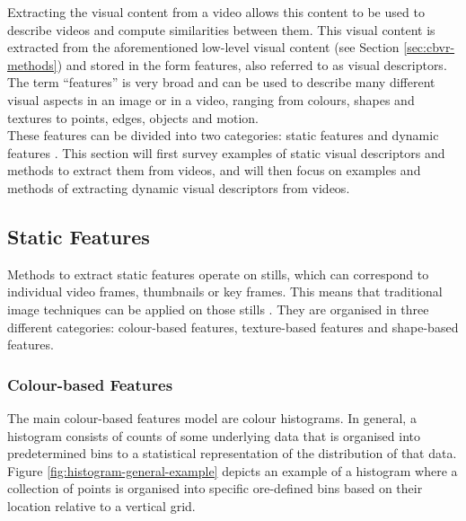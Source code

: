 Extracting the visual content from a video allows this content to be used to describe videos and compute similarities between them. This visual content is extracted from the aforementioned low-level visual content (see Section \ref{sec:cbvr-methods}) \cite{petkovic2000} and stored in the form features, also referred to as visual descriptors. The term ``features'' is very broad and can be used to describe many different visual aspects in an image or in a video, ranging from colours, shapes and textures to points, edges, objects and motion.\\

These features can be divided into two categories: static features and dynamic features \cite{petkovic2000}. This section will first survey examples of static visual descriptors and methods to extract them from videos, and will then focus on examples and methods of extracting dynamic visual descriptors from videos.


\subsection{Static Features}

Methods to extract static features operate on stills, which can correspond to individual video frames, thumbnails or key frames. This means that traditional image techniques can be applied on those stills \cite{hu2011survey}. They are organised in three different categories: colour-based features, texture-based features and shape-based features.

\subsubsection{Colour-based Features}
\label{sec:color-based-features}

The main colour-based features model are colour histograms. In general, a histogram consists of counts of some underlying data that is organised into predetermined bins to a statistical representation of the distribution of that data. Figure \ref{fig:histogram-general-example} depicts an example of a histogram where a collection of points is organised into specific ore-defined bins based on their location relative to a vertical grid.

